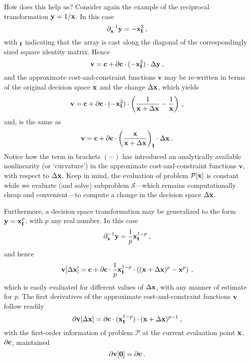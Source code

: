 \documentclass[11pt]{article}
\begin{document}
How does this help us? Consider again the example of the reciprocal transformation $\mathbf{y} = 1/ \mathbf{x}$. In this case
\begin{equation}
\partial_{\mathbf{x}}^{-1} \mathbf{y} = - \mathbf{x}_{\mathbf{I}}^2   \: ,
\end{equation}
with $_{\mathbf{I}}$ indicating that the array is cast along the diagonal of the correspondingly sized square identity matrix. Hence
\begin{equation}
    \textbf{v} = \mathbf{c} + \partial \mathbf{c}  \cdot (-\mathbf{x}_{\mathbf{I}}^2) \cdot \Delta \mathbf{y}  \:,
\end{equation}
and the approximate cost-and-constraint functions $\textbf{v}$ may be re-written in terms of the original decision space $\mathbf{x}$ and the change $\Delta \mathbf{x}$, which yields
\begin{equation}
    \textbf{v} = \mathbf{c} + \partial \mathbf{c} \cdot (-\mathbf{x}_{\mathbf{I}}^2)  \cdot \left( \frac{1}{ \mathbf{x} + \Delta\mathbf{x}} - \frac{1}{\mathbf{x}} \right)   \:,
\end{equation}
and, is the same as
\begin{equation}
    \textbf{v} = \mathbf{c} + \partial \mathbf{c}  \cdot \left( \frac{\mathbf{x}}{\mathbf{x} + \Delta \mathbf{x}} \right)_{\mathbf{I}}\cdot \Delta \mathbf{x}   \:.
\end{equation}
Notice how the term in brackets $(\cdots)$ has introduced an analytically available nonlinearity (or `curvature') in the approximate cost-and-constraint functions $\textbf{v}$, with respect to $\Delta \mathbf{x}$. Keep in mind, the evaluation of problem $\mathcal{P} [\mathbf{x}]$ is constant while we evaluate (and solve) subproblem $\mathcal{S}$---which remains computationally cheap and convenient---to compute a change in the decision space $\Delta \mathbf{x}$.

Furthermore, a decision space transformation may be generalized to the form $\mathbf{y} = \mathbf{x}_{\mathbf{I}}^p$, with $p$ any real number. In this case
\begin{equation}
\partial_{\mathbf{x}}^{-1} \mathbf{y} = \frac {1}{p} \mathbf{x}_{\mathbf{I}}^{1-p}   \: ,
\end{equation}
and hence
\begin{equation}
    \mathbf{v}[\Delta \mathbf{x}] = \mathbf{c} + \partial \mathbf{c} \cdot \frac {1}{p}  \mathbf{x}_{\mathbf{I}}^{1-p}  \cdot \left( (\mathbf{x} + \Delta\mathbf{x})^p - \mathbf{x}^p \right)   \:,
\end{equation}
which is easily evaluated for different values of $\Delta \mathbf{x}$, with any manner of estimate for $p$. The first derivatives of the approximate cost-and-constraint functions $\mathbf{v}$ follow readily
\begin{equation}
\partial\mathbf{v}[\Delta \mathbf{x}] = \partial \mathbf{c} \cdot (\mathbf{x}_{\mathbf{I}}^{1-p}) \cdot (\mathbf{x} + \Delta \mathbf{x})^{p-1} \:,
\end{equation}
with the first-order information of problem $\mathcal{P}$ at the current evaluation point $\mathbf{x}$, $\partial \mathbf{c}$, maintained
\begin{equation}
\partial\mathbf{v}[ \mathbf{0}] = \partial \mathbf{c} \:.
\end{equation}
\end{document}
